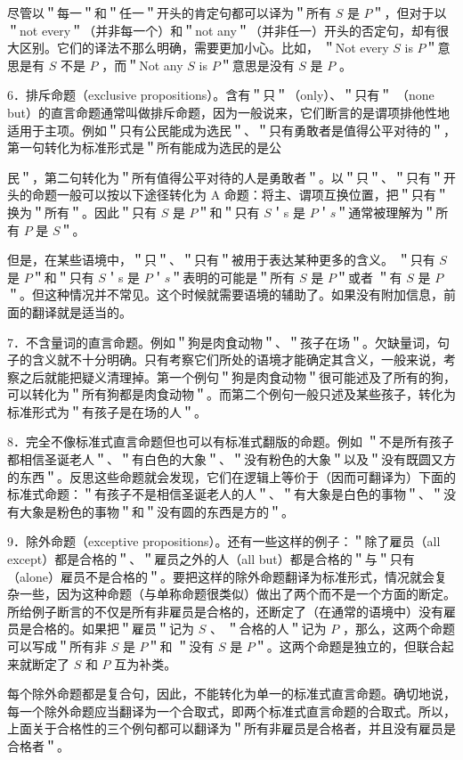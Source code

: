 尽管以＂每一＂和＂任一＂开头的肯定句都可以译为＂所有 $S$ 是 $P$＂，但对于以＂not every＂（并非每一个）和＂not any＂（并非任一）开头的否定句，却有很大区别。它们的译法不那么明确，需要更加小心。比如， ＂Not every $S$ is $P$＂意思是有 $S$ 不是 $P$ ，而＂Not any $S$ is $P$＂意思是没有 $S$ 是 $P$ 。

6．排斥命题（exclusive propositions）。含有＂只＂（only）、＂只有＂ （none but）的直言命题通常叫做排斥命题，因为一般说来，它们断言的是谓项排他性地适用于主项。例如＂只有公民能成为选民＂、＂只有勇敢者是值得公平对待的＂，第一句转化为标准形式是＂所有能成为选民的是公

民＂，第二句转化为＂所有值得公平对待的人是勇敢者＂。以＂只＂、＂只有＂开头的命题一般可以按以下途径转化为 A 命题：将主、谓项互换位置，把＂只有＂换为＂所有＂。因此＂只有 $S$ 是 $P$＂和＂只有 $S$＇s 是 $P$＇$s$＂通常被理解为＂所有 $P$ 是 $S$＂。

但是，在某些语境中，＂只＂、＂只有＂被用于表达某种更多的含义。 ＂只有 $S$ 是 $P$＂和＂只有 $S$＇s 是 $P$＇$s$＂表明的可能是＂所有 $S$ 是 $P$＂或者 ＂有 $S$ 是 $P$＂。但这种情况并不常见。这个时候就需要语境的辅助了。如果没有附加信息，前面的翻译就是适当的。

7．不含量词的直言命题。例如＂狗是肉食动物＂、＂孩子在场＂。欠缺量词，句子的含义就不十分明确。只有考察它们所处的语境才能确定其含义，一般来说，考察之后就能把疑义清理掉。第一个例句＂狗是肉食动物＂很可能述及了所有的狗，可以转化为＂所有狗都是肉食动物＂。而第二个例句一般只述及某些孩子，转化为标准形式为＂有孩子是在场的人＂。

8．完全不像标准式直言命题但也可以有标准式翻版的命题。例如 ＂不是所有孩子都相信圣诞老人＂、＂有白色的大象＂、＂没有粉色的大象＂以及＂没有既圆又方的东西＂。反思这些命题就会发现，它们在逻辑上等价于（因而可翻译为）下面的标准式命题：＂有孩子不是相信圣诞老人的人＂、＂有大象是白色的事物＂、＂没有大象是粉色的事物＂和＂没有圆的东西是方的＂。

9．除外命题（exceptive propositions）。还有一些这样的例子：＂除了雇员（all except）都是合格的＂、＂雇员之外的人（all but）都是合格的＂与＂只有（alone）雇员不是合格的＂。要把这样的除外命题翻译为标准形式，情况就会复杂一些，因为这种命题（与单称命题很类似）做出了两个而不是一个方面的断定。所给例子断言的不仅是所有非雇员是合格的，还断定了（在通常的语境中）没有雇员是合格的。如果把＂雇员＂记为 $S$ 、 ＂合格的人＂记为 $P$ ，那么，这两个命题可以写成＂所有非 $S$ 是 $P$＂和 ＂没有 $S$ 是 $P$＂。这两个命题是独立的，但联合起来就断定了 $S$ 和 $P$ 互为补类。

每个除外命题都是复合句，因此，不能转化为单一的标准式直言命题。确切地说，每一个除外命题应当翻译为一个合取式，即两个标准式直言命题的合取式。所以，上面关于合格性的三个例句都可以翻译为＂所有非雇员是合格者，并且没有雇员是合格者＂。

